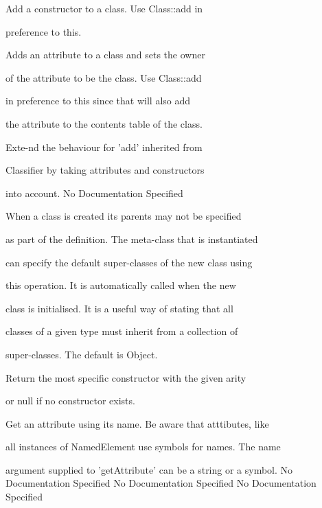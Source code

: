       Add a constructor to a class. Use Class::add in

      preference to this.

       Adds an attribute to a class and sets the owner

       of the attribute to be the class. Use Class::add

       in preference to this since that will also add

       the attribute to the contents table of the class.

      Exte-nd the behaviour for 'add' inherited from

      Classifier by taking attributes and constructors

      into account.
No Documentation Specified

      When a class is created its parents may not be specified

      as part of the definition. The meta-class that is instantiated

      can specify the default super-classes of the new class using

      this operation. It is automatically called when the new

      class is initialised. It is a useful way of stating that all

      classes of a given type must inherit from a collection of

      super-classes. The default is Object.

      Return the most specific constructor with the given arity

      or null if no constructor exists.

      Get an attribute using its name. Be aware that atttibutes, like

      all instances of NamedElement use symbols for names. The name

      argument supplied to 'getAttribute' can be a string or a symbol.
No Documentation Specified
No Documentation Specified
No Documentation Specified

